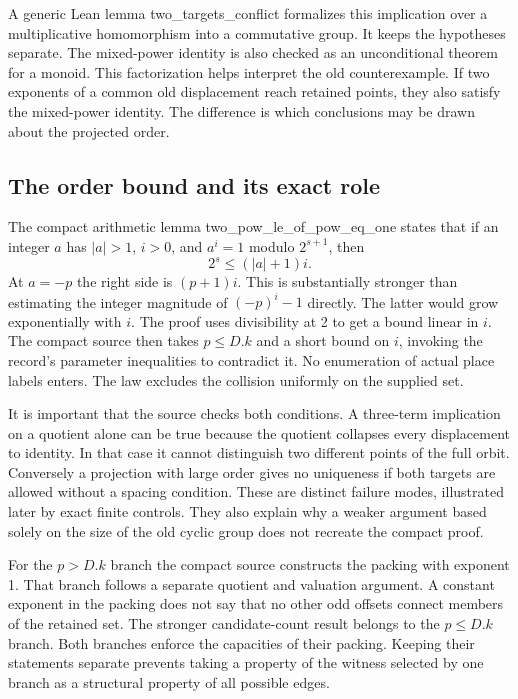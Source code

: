 \documentclass[12pt,letterpaper]{article}
\DeclareRobustCommand{\id}[1]{\mbox{\small\ttfamily #1}}
\begin{document}
A generic Lean lemma \id{two\_targets\_conflict} formalizes this implication over a multiplicative homomorphism into a commutative group. It keeps the hypotheses separate. The mixed-power identity is also checked as an unconditional theorem for a monoid. This factorization helps interpret the old counterexample. If two exponents of a common old displacement reach retained points, they also satisfy the mixed-power identity. The difference is which conclusions may be drawn about the projected order.

\subsection{The order bound and its exact role}

The compact arithmetic lemma \id{two\_pow\_le\_of\_pow\_eq\_one} states that if an integer $a$ has $|a|>1$, $i>0$, and \(a^i=1\) modulo \(2^{s+1}\), then
\[
                   2^s\le (|a|+1)i.
\]
At $a=-p$ the right side is $(p+1)i$. This is substantially stronger than estimating the integer magnitude of $(-p)^i-1$ directly. The latter would grow exponentially with $i$. The proof uses divisibility at 2 to get a bound linear in $i$. The compact source then takes $p\le D.k$ and a short bound on $i$, invoking the record's parameter inequalities to contradict it. No enumeration of actual place labels enters. The law excludes the collision uniformly on the supplied set.

It is important that the source checks both conditions. A three-term implication on a quotient alone can be true because the quotient collapses every displacement to identity. In that case it cannot distinguish two different points of the full orbit. Conversely a projection with large order gives no uniqueness if both targets are allowed without a spacing condition. These are distinct failure modes, illustrated later by exact finite controls. They also explain why a weaker argument based solely on the size of the old cyclic group does not recreate the compact proof.

For the $p>D.k$ branch the compact source constructs the packing with exponent 1. That branch follows a separate quotient and valuation argument. A constant exponent in the packing does not say that no other odd offsets connect members of the retained set. The stronger candidate-count result belongs to the $p\le D.k$ branch. Both branches enforce the capacities of their packing. Keeping their statements separate prevents taking a property of the witness selected by one branch as a structural property of all possible edges.
\end{document}
